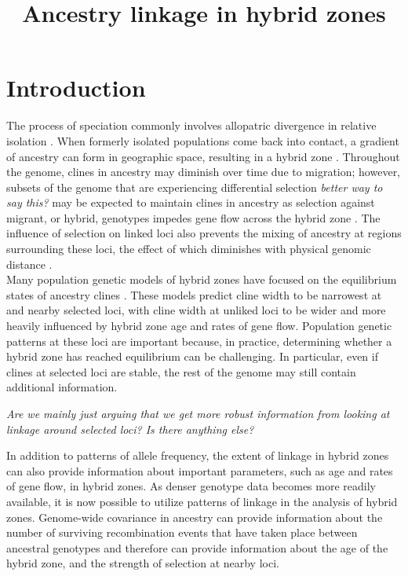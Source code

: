 \documentclass[12pt]{amsart}
\title{Ancestry linkage in hybrid zones}
\author{}
\date{} %
\newcommand{\alisa}[1]{{\em \color{red} #1}}
\begin{document}
\maketitle

\section{Introduction}
The process of speciation commonly involves allopatric divergence in relative isolation \cite{Coyne2004}. When formerly isolated populations come back into contact, a gradient of ancestry can form in geographic space, resulting in a hybrid zone \cite{Barton1985}. Throughout the genome, clines in ancestry may diminish over time due to migration; however, subsets of the genome that are experiencing differential selection \alisa{better way to say this?} may be expected to maintain clines in ancestry as selection against migrant, or hybrid, genotypes impedes gene flow across the hybrid zone \cite{Barton1979a}. The influence of selection on linked loci also prevents the mixing of ancestry at regions surrounding these loci, the effect of which diminishes with physical genomic distance \cite{Barton1986}.\\

Many population genetic models of hybrid zones have focused on the equilibrium states of ancestry clines \cite{Barton1979a,Barton1986}. These models predict cline width to be narrowest at and nearby selected loci, with cline width at unliked loci to be wider and more heavily influenced by hybrid zone age and rates of gene flow. Population genetic patterns at these loci are important because, in practice, determining whether a hybrid zone has reached equilibrium can be challenging. In particular, even if clines at selected loci are stable, the rest of the genome may still contain additional information. 

\alisa{Are we mainly just arguing that we get more robust information from looking at linkage around selected loci? Is there anything else?}

In addition to patterns of allele frequency, the extent of linkage in hybrid zones can also provide information about important parameters, such as age and rates of gene flow, in hybrid zones. As denser genotype data becomes more readily available, it is now possible to utilize patterns of linkage in the analysis of hybrid zones. Genome-wide covariance in ancestry can provide information about the number of surviving recombination events that have taken place between ancestral genotypes and therefore can provide information about the age of the hybrid zone, and the strength of selection at nearby loci.\\
\end{document}
